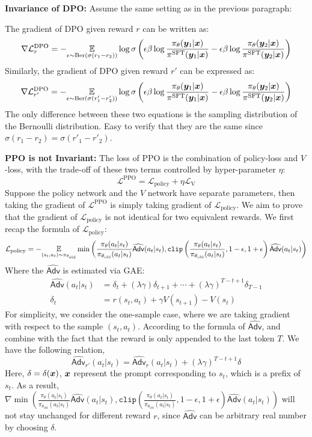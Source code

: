 \documentclass{article} %
\begin{document}
\textbf{Invariance of DPO:}
Assume the same setting as in the previous paragraph:

The gradient of DPO given reward $r$ can be written as:
$$\nabla\mathcal{L}_r^{\text{DPO}} = -\underset{
\epsilon \sim \text{Ber}(\sigma(r_1-r_2))
}{\mathbb{E}}\log\sigma\left(\epsilon\beta\log\frac{\pi_\theta({\bm{y}}_1|{\bm{x}})}{\pi^{\text{SFT}}({\bm{y}}_1|{\bm{x}})}-\epsilon\beta\log\frac{\pi_\theta({\bm{y}}_2|{\bm{x}})}{\pi^{\text{SFT}}({\bm{y}}_2|{\bm{x}})}\right)$$
Similarly, the gradient of DPO given reward $r'$ can be expressed as:
$$\nabla\mathcal{L}_{r'}^{\text{DPO}} = -\underset{
\epsilon \sim \text{Ber}(\sigma(r'_1-r'_2))
}{\mathbb{E}}\log\sigma\left(\epsilon\beta\log\frac{\pi_\theta({\bm{y}}_1|{\bm{x}})}{\pi^{\text{SFT}}({\bm{y}}_1|{\bm{x}})}-\epsilon\beta\log\frac{\pi_\theta({\bm{y}}_2|{\bm{x}})}{\pi^{\text{SFT}}({\bm{y}}_2|{\bm{x}})}\right)$$
The only difference between these two equations is the sampling distribution of the Bernoulli distribution. Easy to verify that they are the same since $\sigma(r_1 - r_2) = \sigma(r'_1-r'_2)$.

\textbf{PPO is not Invariant:} The loss of PPO is the combination of policy-loss and $V$-loss, with the trade-off of these two terms controlled by hyper-parameter $\eta$:
$$\mathcal{L}^{\text{PPO}} = \mathcal{L}_{\text{policy}}+\eta\mathcal{L}_{\text{V}}$$
Suppose the policy network and the $V$ network have separate parameters, then taking the gradient of $\mathcal{L}^{\text{PPO}}$ is simply taking gradient of $\mathcal{L}_{\text{policy}}$. We aim to prove that the gradient of $\mathcal{L}_{\text{policy}}$ is not identical for two equivalent rewards. We first recap the formula of $\mathcal{L}_{\text{policy}}$:
\begin{align*}
    \mathcal{L}_{\text{policy}} = -\underset{(s_t,a_t)\sim\pi_{\theta_{\text{old}}}}{\mathbb{E}}\min\left(\frac{\pi_\theta(a_t|s_t)}{\pi_{\theta_{\text{old}}}(a_t|s_t)}\widehat{\textsf{Adv}}(a_t|s_t),\texttt{clip}\left(\frac{\pi_\theta(a_t|s_t)}{\pi_{\theta_{\text{old}}}(a_t|s_t)},1-\epsilon,1+\epsilon\right)\widehat{\textsf{Adv}}(a_t|s_t)\right)
\end{align*}
Where the $\widehat{\textsf{Adv}}$ is estimated via GAE:
\begin{align*}
    \widehat{\textsf{Adv}}(a_t|s_t) &= \delta_t+(\lambda\gamma)\delta_{t+1}+\cdots+(\lambda\gamma)^{T-t+1}\delta_{T-1}\\
    \delta_t &= r(s_t,a_t) + \gamma V(s_{t+1}) - V(s_{t}) 
\end{align*}
For simplicity, we consider the one-sample case, where we are taking gradient with respect to the sample $(s_t,a_t)$. According to the formula of $\widehat{\textsf{Adv}}$, and combine with the fact that the reward is only appended to the last token $T$. We have the following relation,
$$\widehat{\textsf{Adv}}_{r'}(a_t|s_t) = \widehat{\textsf{Adv}}_r(a_t|s_t) + (\lambda\gamma)^{T-t+1}\delta$$
Here, $\delta = \delta({\bm{x}})$, ${\bm{x}}$ represent the prompt corresponding to $s_t$, which is a prefix of $s_t$. As a result, $\nabla\min\left(\frac{\pi_\theta(a_t|s_t)}{\pi_{\theta_{\text{old}}}(a_t|s_t)}\widehat{\textsf{Adv}}(a_t|s_t),\texttt{clip}\left(\frac{\pi_\theta(a_t|s_t)}{\pi_{\theta_{\text{old}}}(a_t|s_t)},1-\epsilon,1+\epsilon\right)\widehat{\textsf{Adv}}(a_t|s_t)\right)$ will not stay unchanged for different reward $r$, since $\widehat{\textsf{Adv}}$ can be arbitrary real number by choosing $\delta$.
\end{document}
